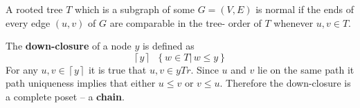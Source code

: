 \documentclass[a4paper]{article}
\newcommand{\obj}[1]{{\left\{ #1 \right \}}}
\newcommand{\induc}[1]{{\left . #1 \right \vert}}
\newcommand{\ceil}[1]{{\left\lceil #1 \right\rceil}}
\newcommand{\defn}{\mathop{\overset{\Delta}{=}}\nolimits}
\begin{document}
A rooted tree $T$ which is a subgraph of some $G=(V,E)$ is normal if 
the ends of every edge $(u,v)$ of $G$ are comparable in the tree-
order of $T$ whenever $u,v\in T$.

The \textbf{down-closure} of a node $y$ is defined as
\[\ceil{y} \defn \obj{\induc{w\in T}\, w\leq y}\]
For any $u,v\in \ceil{y}$ it is true that $u,v\in yTr$. Since $u$
and $v$ lie on the same path it path uniqueness implies that either
$u\leq v$ or $v\leq u$. Therefore the down-closure is a complete
poset -- a \textbf{chain}.







\end{document}
